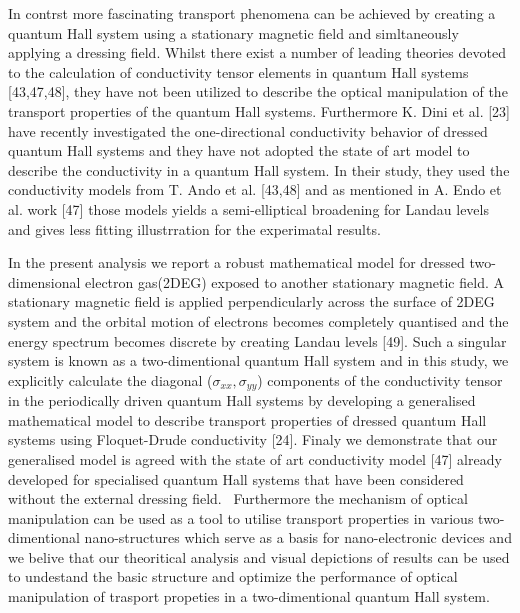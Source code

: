 In contrst more fascinating transport phenomena can be achieved by creating a quantum Hall system using a stationary magnetic field and simltaneously applying a dressing field.
Whilst there exist a number of leading theories devoted to the calculation of conductivity tensor elements in quantum Hall systems [43,47,48], they have not been utilized to describe the optical manipulation of the transport properties of the quantum Hall systems.
Furthermore K. Dini et al. [23] have recently investigated the one-directional conductivity behavior of dressed quantum Hall systems and they have not adopted the state of art model to describe the conductivity in a quantum Hall system. In their study, they used the conductivity models from T. Ando et al. [43,48] and as mentioned in A. Endo et al. work [47] those models yields a semi-elliptical broadening for Landau levels and gives less fitting illustrration for the experimatal results.

In the present analysis we report a robust mathematical model for dressed two-dimensional electron gas(2DEG) exposed to another stationary magnetic field.
A stationary magnetic field is applied perpendicularly across the surface of 2DEG system and the orbital motion of electrons becomes completely quantised and the energy spectrum becomes discrete by creating Landau levels [49].
Such a singular system is known as a two-dimentional quantum Hall system and in this study, we explicitly calculate the diagonal ($\sigma_{xx},\sigma_{yy}$) components of the conductivity tensor in the periodically driven quantum Hall systems by developing a generalised mathematical model to describe transport properties of dressed quantum Hall systems using Floquet-Drude conductivity [24].
Finaly we demonstrate that our generalised model is agreed with the state of art conductivity model [47] already developed for specialised quantum Hall systems that have been considered without the external dressing field.  
Furthermore the mechanism of optical manipulation can be used as a tool to utilise transport properties in various two-dimentional nano-structures which serve as a basis for nano-electronic devices and we belive that our theoritical analysis and visual depictions of results can be used to undestand the basic structure and optimize the performance of optical manipulation of trasport propeties in a two-dimentional quantum Hall system.
